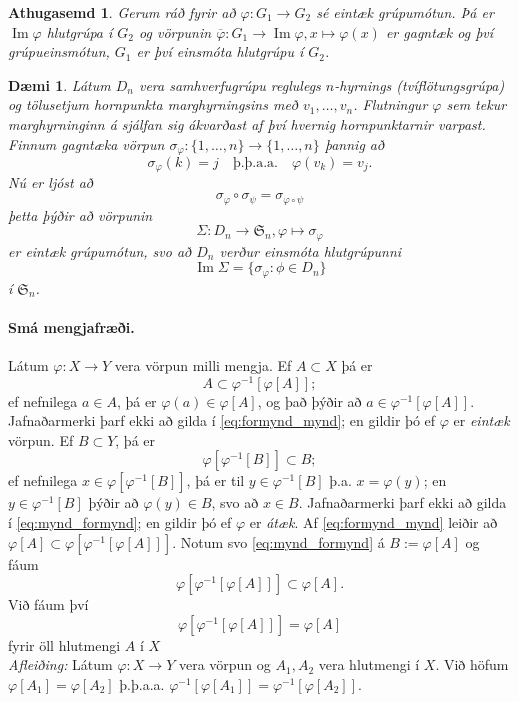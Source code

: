 \documentclass[a4paper,icelandic,11pt]{book}
\theoremstyle{plain}
\newtheorem{daemi}{Dæmi}[chapter]
\newtheorem*{ath}{Athugasemd}
\DeclareMathOperator{\im}{Im} %
\begin{document}
\begin{ath}
  Gerum ráð fyrir að $\varphi: G_1\to G_2$ sé \emph{eintæk} grúpumótun. Þá er
  $\im \varphi$ hlutgrúpa í $G_2$ og vörpunin $\overline \varphi:G_1\to \im \varphi,
  x\mapsto \varphi(x)$ er \emph{gagntæk} og því grúpueinsmótun, $G_1$ er því
  einsmóta hlutgrúpu í $G_2$.
\end{ath}
\begin{daemi}
  Látum $D_n$ vera samhverfugrúpu reglulegs $n$-hyrnings
  (\emph{tvíflötungsgrúpa})
  og tölusetjum hornpunkta marghyrningsins með
  $v_1,\dots,v_n$. Flutningur $\varphi$ sem tekur marghyrninginn á sjálfan sig
  ákvarðast af því hvernig hornpunktarnir varpast. Finnum gagntæka vörpun
  $\sigma_\varphi:\{1,\dots,n\}\to \{1,\dots,n\}$ þannig að 
  \[
    \sigma_\varphi(k) = j \quad \text{þ.þ.a.a.} \quad \varphi(v_k) = v_j.
  \]
  Nú er ljóst að 
  \[
    \sigma_\varphi \circ \sigma_\psi = \sigma_{\varphi\circ \psi}
  \]
  þetta þýðir að vörpunin
  \[
    \Sigma: D_n \to \mathfrak S_n, \varphi\mapsto \sigma_\varphi
  \]
  er \emph{eintæk grúpumótun}, svo að $D_n$ verður einsmóta hlutgrúpunni 
  \[
    \im \Sigma = \{\sigma_\varphi: \phi\in D_n\}
  \]
  í $\mathfrak S_n$.
\end{daemi}


\paragraph{Smá mengjafræði.} %
Látum $\varphi:X\to Y$ vera vörpun milli mengja. Ef $A\subset X$ þá er 
\begin{equation}
  A\subset \varphi^{-1}[\varphi[A]]; \label{eq:formynd_mynd}
\end{equation}
ef nefnilega $a\in A$, þá er $\varphi(a)\in \varphi[A]$, og það þýðir að $a\in
\varphi^{-1}[\varphi[A]]$. Jafnaðarmerki þarf ekki að gilda í
\eqref{eq:formynd_mynd}; en gildir þó ef $\varphi$ er \emph{eintæk} vörpun.  Ef
$B\subset Y$, þá er 
\begin{equation}
  \varphi[\varphi^{-1}[B]] \subset B; \label{eq:mynd_formynd}
\end{equation}
ef nefnilega $x\in \varphi[\varphi^{-1}[B]]$, þá er til $y\in \varphi^{-1}[B]$
þ.a. $x=\varphi(y)$; en $y\in \varphi^{-1}[B]$ þýðir að $\varphi(y)\in B$, svo
að $x\in B$. Jafnaðarmerki þarf ekki að gilda í \eqref{eq:mynd_formynd}; en
gildir þó ef $\varphi$ er \emph{átæk}.  Af \eqref{eq:formynd_mynd} leiðir að
$\varphi[A]\subset\varphi[\varphi^{-1}[\varphi[A]]]$. Notum svo
\eqref{eq:mynd_formynd} á $B:=\varphi[A]$ og fáum
\[
  \varphi[\varphi^{-1}[\varphi[A]]]\subset\varphi[A].
\]
Við fáum því \[
  \varphi[\varphi^{-1}[\varphi[A]]] = \varphi[A]
\]
fyrir öll hlutmengi $A$ í $X$
\\
\emph{Afleiðing:} Látum $\varphi: X\to Y$ vera vörpun og $A_1,A_2$ vera
hlutmengi í $X$. Við höfum $\varphi[A_1]=\varphi[A_2]$ þ.þ.a.a.
$\varphi^{-1}[\varphi[A_1]] = \varphi^{-1}[\varphi[A_2]]$.
\end{document}
